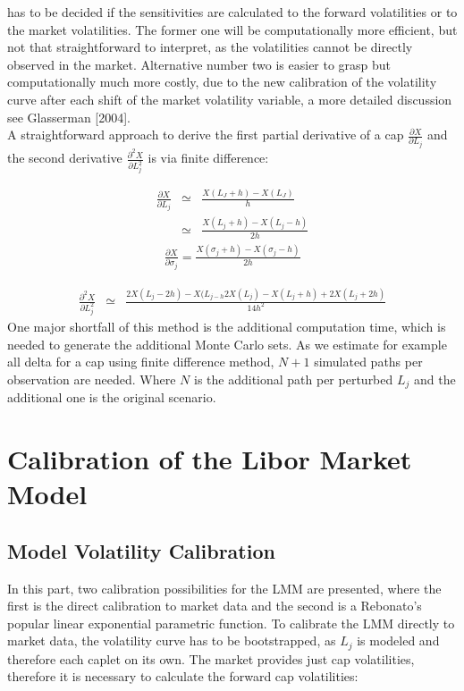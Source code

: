 \documentclass[11pt]{article}
\numberwithin{equation}{subsection}
\begin{document}
has to be decided if the sensitivities are calculated to the forward volatilities or to the market volatilities. The former one will be computationally more efficient, but not that straightforward to interpret, as the volatilities cannot be directly observed in the market. Alternative number two is easier to grasp but computationally much more costly, due to the new calibration of the volatility curve after each shift of the market volatility variable, a more detailed discussion see Glasserman [2004].\\
A straightforward approach to derive the first partial derivative of a cap \(\frac{\partial X}{\partial L_j}\) and the second derivative \(\frac{\partial^2 X}{\partial L_j^2}\) is via finite difference:


\begin{eqnarray*}
	\frac{\partial X}{\partial L_j} &\simeq& \frac{X(L_J + h) - X(L_J)}{h} \\
	&\simeq& \frac{X(L_{j} + h) - X(L_{j} - h)}{2h}
\end{eqnarray*}	
\begin{eqnarray*}
	\frac{\partial X}{\partial \sigma_{j}} = \frac{X(\sigma_{j} + h) - X(\sigma_{j} - h)}{2h}
\end{eqnarray*}

\begin{eqnarray*}
	\frac{\partial^2 X}{\partial L_{j}^2}  &\simeq&  \frac{2X(L_{j} -2h) - X(L_{j-h} 2X (L_{j}) -X(L_{j} + h) + 2X(L_j + 2h)}{14h^2}
\end{eqnarray*}
One major shortfall of this method is the additional computation time, which is needed to generate the additional Monte Carlo sets. As we estimate for example all delta for a cap using finite difference method, \(N+1\) simulated paths per observation are needed. Where \(N\) is the additional path per perturbed \(L_j\) and the additional one is the original scenario.


\section{Calibration of the Libor Market Model}
\subsection{Model Volatility Calibration}
In this part, two calibration possibilities for the LMM are presented, where the first is the direct calibration to market data and the second is a Rebonato's popular linear exponential parametric function. To calibrate the LMM directly to market data, the volatility curve has to be bootstrapped, as \(L_j\) is modeled and therefore each caplet on its own. The market provides just cap volatilities, therefore it is necessary to calculate the forward cap volatilities:
\end{document}
